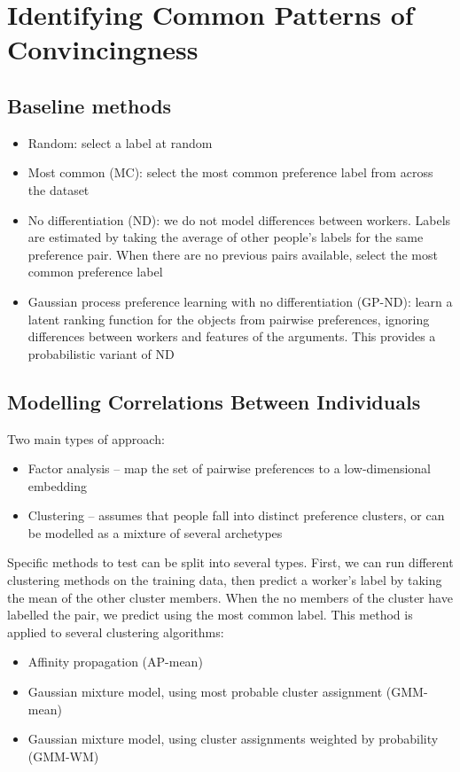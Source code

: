 \section{Identifying Common Patterns of Convincingness}\label{sec:model}

\subsection{Baseline methods}

\begin{itemize}
  \item Random: select a label at random
  \item Most common (MC): select the most common preference label from across the dataset
  \item No differentiation (ND): we do not model differences between workers. Labels are estimated by taking the average of other people's labels for the same preference pair. When there are no previous pairs available, select the most common preference label
  \item Gaussian process preference learning with no differentiation (GP-ND): learn a latent ranking function for the objects from pairwise preferences, ignoring differences between workers and features of the arguments. This provides a probabilistic variant of ND  
\end{itemize}

\subsection{Modelling Correlations Between Individuals}

Two main types of approach:
\begin{itemize}
  \item Factor analysis -- map the set of pairwise preferences to a low-dimensional embedding
  \item Clustering -- assumes that people fall into distinct preference clusters, or can be modelled as a mixture of several archetypes
\end{itemize}

Specific methods to test can be split into several types. First,
we can run different clustering methods on the training data, 
then predict a worker's label by taking the mean of the other cluster members. 
When the no members of the cluster have labelled the pair, we predict using the most common label.
This method is applied to several clustering algorithms:
\begin{itemize}
   \item Affinity propagation (AP-mean)
   \item Gaussian mixture model, using most probable cluster assignment (GMM-mean)
   \item Gaussian mixture model, using cluster assignments weighted by probability (GMM-WM)
\end{itemize}

